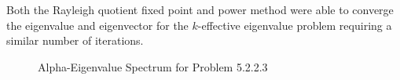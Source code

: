 Both the Rayleigh quotient fixed point and power method were able to converge the eigenvalue and eigenvector for the $k$-effective eigenvalue problem requiring a similar number of iterations. 

\begin{figure}
\centering
	\resizebox{0.75\textwidth}{!}{
	}
\caption{Alpha-Eigenvalue Spectrum for Problem 5.2.2.3}
\label{fig:G81P3Spec}
\end{figure}

\begin{table}[H]
    \centering
    \caption{Transport Sweeps for Convergence for Problem 5.2.2.3}
\label{table:G81c}
\end{table}





\label{sec:Res}


